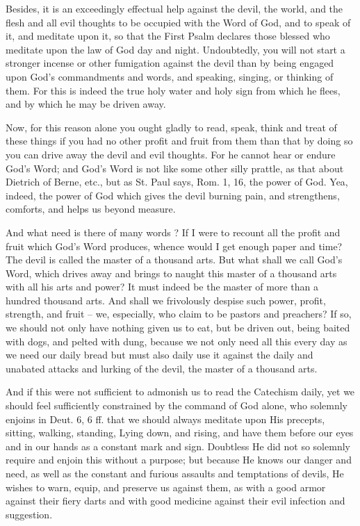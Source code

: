 Besides, it is an exceedingly effectual help against the devil, the
world, and the flesh and all evil thoughts to be occupied with the Word
of God, and to speak of it, and meditate upon it, so that the First
Psalm declares those blessed who meditate upon the law of God day and
night. Undoubtedly, you will not start a stronger incense or other
fumigation against the devil than by being engaged upon God's
commandments and words, and speaking, singing, or thinking of them. For
this is indeed the true holy water and holy sign from which he flees,
and by which he may be driven away.

Now, for this reason alone you ought gladly to read, speak, think and
treat of these things if you had no other profit and fruit from them
than that by doing so you can drive away the devil and evil thoughts.
For he cannot hear or endure God's Word; and God's Word is not like
some other silly prattle, as that about Dietrich of Berne, etc., but as
St. Paul says, Rom. 1, 16, the power of God. Yea, indeed, the power of
God which gives the devil burning pain, and strengthens, comforts, and
helps us beyond measure.

And what need is there of many words ? If I were to recount all the
profit and fruit which God's Word produces, whence would I get enough
paper and time? The devil is called the master of a thousand arts. But
what shall we call God's Word, which drives away and brings to naught
this master of a thousand arts with all his arts and power? It must
indeed be the master of more than a hundred thousand arts. And shall we
frivolously despise such power, profit, strength, and fruit -- we,
especially, who claim to be pastors and preachers? If so, we should not
only have nothing given us to eat, but be driven out, being baited with
dogs, and pelted with dung, because we not only need all this every day
as we need our daily bread but must also daily use it against the daily
and unabated attacks and lurking of the devil, the master of a thousand
arts.

And if this were not sufficient to admonish us to read the Catechism
daily, yet we should feel sufficiently constrained by the command of
God alone, who solemnly enjoins in Deut. 6, 6 ff. that we should always
meditate upon His precepts, sitting, walking, standing, Lying down, and
rising, and have them before our eyes and in our hands as a constant
mark and sign. Doubtless He did not so solemnly require and enjoin this
without a purpose; but because He knows our danger and need, as well as
the constant and furious assaults and temptations of devils, He wishes
to warn, equip, and preserve us against them, as with a good armor
against their fiery darts and with good medicine against their evil
infection and suggestion.

